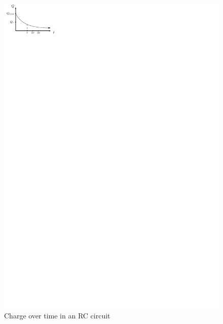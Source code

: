 \documentclass{article}
\begin{document}
\begin{itemize}
\begin{figure}[H]
          \includegraphics{figures/rc-charge-time.pdf}
          \caption{Charge over time in an RC circuit}
        \end{figure}
    \end{itemize}
\end{document}
